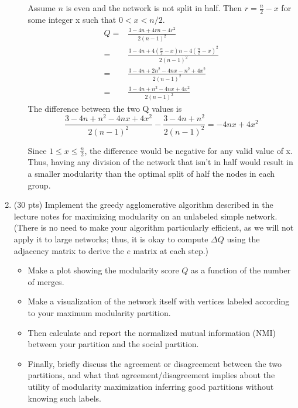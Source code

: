 \documentclass[12pt,letterpaper]{article}
\begin{document}
\begin{enumerate}
\begin{enumerate}
         Assume $n$ is even and the network is not split in half. Then $r = \frac{n}{2} -x$ for some integer x such that $0 < x < n/2$.
        \begin{align*}
            Q =& \frac{3 - 4n + 4rn - 4r^{2}}{2(n - 1)^2} \\
            =& \frac{3 - 4n + 4 (\frac{n}{2}-x)n - 4 (\frac{n}{2}-x)^2} {2(n-1)^2} \\
            =& \frac{3 - 4n + 2 n^2 - 4nx - n^2 +4x^2} {2(n-1)^2} \\
            =& \frac{3 - 4n + n^2 -4nx +4x^2} {2(n-1)^2}
        \end{align*}
        The difference between the two Q values is
        $$ \frac{3 - 4n + n^2 -4nx +4x^2} {2(n-1)^2} - \frac{3 - 4n + n^2} {2(n-1)^2} = -4nx +4x^2 $$

        Since $1 \leq x \leq \frac{n}{2}$, the difference would be negative for any valid value of x. Thus, having any division of the network that isn't in half would result in a smaller modularity than the optimal split of half the nodes in each group.

    \end{enumerate}

    \newpage
    \item (30 pts) Implement the greedy agglomerative algorithm described in the lecture notes for maximizing modularity on an unlabeled simple network. (There is no need to make your algorithm particularly efficient, as we will not apply it to large networks; thus, it is okay to compute $\Delta Q$ using the adjacency matrix to derive the $e$ matrix at each step.)

    \begin{itemize}
        \item Make a plot showing the modularity score $Q$ as a function of the number of merges.

        \item Make a visualization of the network itself with vertices labeled according to your maximum modularity partition.

        \item Then calculate and report the normalized mutual information (NMI) between your partition and the social partition.

        \item Finally, briefly discuss the agreement or disagreement between the two partitions, and what that agreement/disagreement implies about the utility of modularity maximization inferring good partitions without knowing such labels.


\end{itemize}
\end{enumerate}
\end{document}

